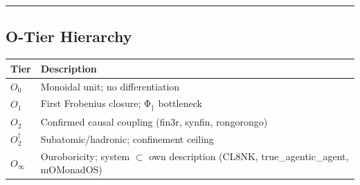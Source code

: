 \documentclass[12pt,a4paper]{article}
\newcommand{\heb}[1]{{\igprimfont #1}}
\begin{document}
\begin{center}\rule{0.5\linewidth}{0.5pt}\end{center}

\hypertarget{o-tier-hierarchy}{%
\subsection{O-Tier Hierarchy}\label{o-tier-hierarchy}}

\begin{longtable}[]{@{}ll@{}}
\toprule
\begin{minipage}[b]{0.47\columnwidth}\raggedright
Tier\strut
\end{minipage} & \begin{minipage}[b]{0.47\columnwidth}\raggedright
Description\strut
\end{minipage}\tabularnewline
\midrule
\endhead
\begin{minipage}[t]{0.47\columnwidth}\raggedright
\(O_0\)\strut
\end{minipage} & \begin{minipage}[t]{0.47\columnwidth}\raggedright
Monoidal unit; no differentiation\strut
\end{minipage}\tabularnewline
\begin{minipage}[t]{0.47\columnwidth}\raggedright
\(O_1\)\strut
\end{minipage} & \begin{minipage}[t]{0.47\columnwidth}\raggedright
First Frobenius closure; \heb{Φ}\(_\}\) bottleneck\strut
\end{minipage}\tabularnewline
\begin{minipage}[t]{0.47\columnwidth}\raggedright
\(O_2\)\strut
\end{minipage} & \begin{minipage}[t]{0.47\columnwidth}\raggedright
Confirmed causal coupling (fin3r, synfin, rongorongo)\strut
\end{minipage}\tabularnewline
\begin{minipage}[t]{0.47\columnwidth}\raggedright
\(O_2^\dagger\)\strut
\end{minipage} & \begin{minipage}[t]{0.47\columnwidth}\raggedright
Subatomic/hadronic; confinement ceiling\strut
\end{minipage}\tabularnewline
\begin{minipage}[t]{0.47\columnwidth}\raggedright
\(O_\infty\)\strut
\end{minipage} & \begin{minipage}[t]{0.47\columnwidth}\raggedright
Ouroboricity; system \(\subset\) own description (CL8NK,
true\_agentic\_agent, mOMonadOS)\strut
\end{minipage}\tabularnewline
\bottomrule
\end{longtable}
\end{document}
